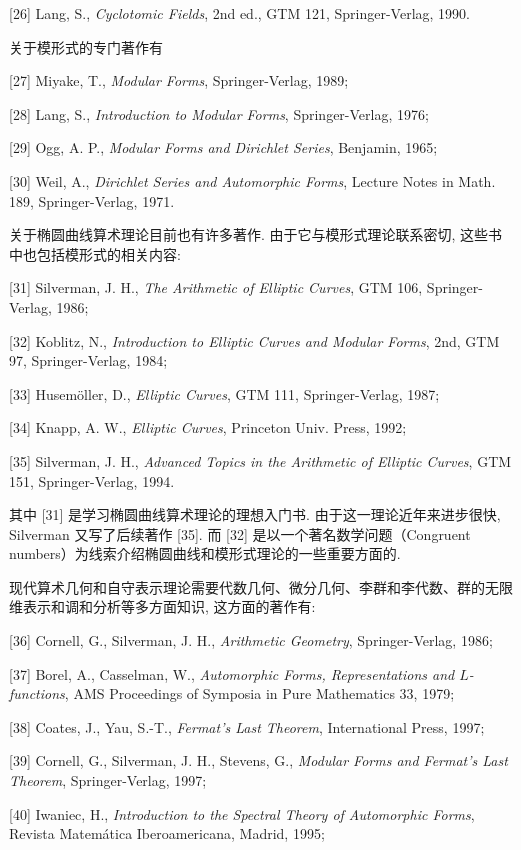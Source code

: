 [26] Lang, S., \emph{Cyclotomic Fields}, 2nd ed., GTM 121, Springer-Verlag, 1990.

关于模形式的专门著作有

[27] Miyake, T., \emph{Modular Forms}, Springer-Verlag, 1989;

[28] Lang, S., \emph{Introduction to Modular Forms}, Springer-Verlag, 1976;

[29] Ogg, A. P., \emph{Modular Forms and Dirichlet Series}, Benjamin, 1965;

[30] Weil, A., \emph{Dirichlet Series and Automorphic Forms}, Lecture Notes in Math. 189, Springer-Verlag, 1971.

关于椭圆曲线算术理论目前也有许多著作. 由于它与模形式理论联系密切, 这些书中也包括模形式的相关内容:

[31] Silverman, J. H., \emph{The Arithmetic of Elliptic Curves}, GTM 106, Springer-Verlag, 1986;

[32] Koblitz, N., \emph{Introduction to Elliptic Curves and Modular Forms}, 2nd, GTM 97, Springer-Verlag, 1984;

[33] Husem\"oller, D., \emph{Elliptic Curves}, GTM 111, Springer-Verlag, 1987;

[34] Knapp, A. W., \emph{Elliptic Curves}, Princeton Univ. Press, 1992;

[35] Silverman, J. H., \emph{Advanced Topics in the Arithmetic of Elliptic Curves}, GTM 151, Springer-Verlag, 1994.

其中 [31] 是学习椭圆曲线算术理论的理想入门书. 由于这一理论近年来进步很快, Silverman 又写了后续著作 [35]. 而 [32] 是以一个著名数学问题（Congruent numbers）为线索介绍椭圆曲线和模形式理论的一些重要方面的.

现代算术几何和自守表示理论需要代数几何、微分几何、李群和李代数、群的无限维表示和调和分析等多方面知识, 这方面的著作有:

[36] Cornell, G., Silverman, J. H., \emph{Arithmetic Geometry}, Springer-Verlag, 1986;

[37] Borel, A., Casselman, W., \emph{Automorphic Forms, Representations and $L$-functions}, AMS Proceedings of Symposia in Pure Mathematics 33, 1979;

[38] Coates, J., Yau, S.-T., \emph{Fermat's Last Theorem}, International Press, 1997;

[39] Cornell, G., Silverman, J. H., Stevens, G., \emph{Modular Forms and Fermat's Last Theorem}, Springer-Verlag, 1997;

[40] Iwaniec, H., \emph{Introduction to the Spectral Theory of Automorphic Forms}, Revista Matem\'atica Iberoamericana, Madrid, 1995;

